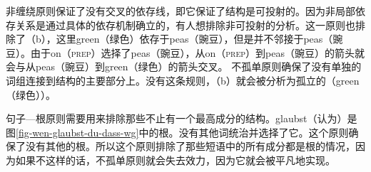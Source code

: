 \noindent
非缠绕原则保证了没有交叉的依存线，即它保证了结构是可投射的\citep[]{Hudson2000a}。因为非局部依存关系是通过具体的依存机制确立的，有人想排除非可投射的分析。这一原则也排除了（b），这里green（绿色）依存于peas（豌豆），但是并不邻接于peas（豌豆）。由于on（\textsc{prep}）选择了peas（豌豆），从on（\textsc{prep}）到peas（豌豆）的箭头就会与从peas（豌豆）到green（绿色）的箭头交叉。
\eal
{}
\zl
不孤单原则确保了没有单独的词组连接到结构的主要部分上。没有这条规则，（b）就会被分析为孤立的（green（绿色））\citep[]{Hudson2000a}。

句子—根原则需要用来排除那些不止有一个最高成分的结构。glaubst（认为）是图\ref{fig-wen-glaubst-du-dass-wg}中的根。没有其他词统治并选择了它。这个原则确保了没有其他的根。所以这个原则排除了那些短语中的所有成分都是根的情况，因为如果不这样的话，不孤单原则就会失去效力，因为它就会被平凡地实现\citep[]{Hudson2000a}。

